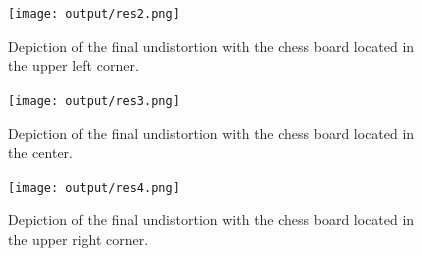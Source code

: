 \documentclass[twocolumn,10pt]{asme2ej}
\begin{document}
\begin{figure}[H]
    \centerline{\texttt{[image: output/res2.png]}}
    \caption{Depiction of the final undistortion with the chess board located in the upper left corner.}
    \label{fig:res2}
\end{figure}

\begin{figure}[H]
    \centerline{\texttt{[image: output/res3.png]}}
    \caption{Depiction of the final undistortion with the chess board located in the center.}
    \label{fig:res3}
\end{figure}

\begin{figure}[H]
    \centerline{\texttt{[image: output/res4.png]}}
    \caption{Depiction of the final undistortion with the chess board located in the upper right corner.}
    \label{fig:res4}
\end{figure}

\pagebreak

% 



\end{document}
